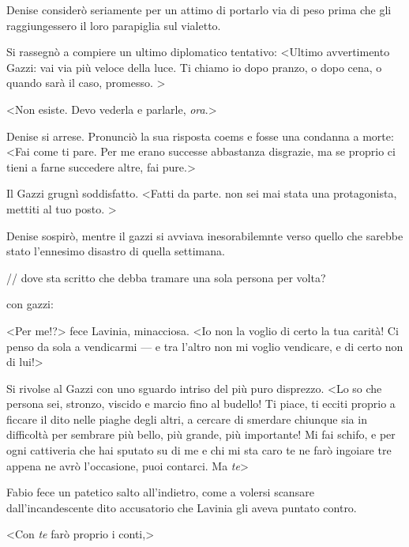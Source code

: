 Denise considerò seriamente per un attimo di portarlo via di peso prima
che gli raggiungessero il loro parapiglia sul vialetto.

Si rassegnò a compiere un ultimo diplomatico tentativo:
\textless{}Ultimo avvertimento Gazzi: vai via più veloce della luce. Ti
chiamo io dopo pranzo, o dopo cena, o quando sarà il caso, promesso.
\textgreater{}

\textless{}Non esiste. Devo vederla e parlarle,
\emph{ora}.\textgreater{}

Denise si arrese. Pronunciò la sua risposta coems e fosse una condanna a
morte: \textless{}Fai come ti pare. Per me erano successe abbastanza
disgrazie, ma se proprio ci tieni a farne succedere altre, fai
pure.\textgreater{}

Il Gazzi grugnì soddisfatto. \textless{}Fatti da parte. non sei mai
stata una protagonista, mettiti al tuo posto. \textgreater{}

Denise sospirò, mentre il gazzi si avviava inesorabilemnte verso quello
che sarebbe stato l'ennesimo disastro di quella settimana.

// dove sta scritto che debba tramare una sola persona per volta?

con gazzi:

\textless{}Per me!?\textgreater{} fece Lavinia, minacciosa.
\textless{}Io non la voglio di certo la tua carità! Ci penso da sola a
vendicarmi --- e tra l'altro non mi voglio vendicare, e di certo non di
lui!\textgreater{}

Si rivolse al Gazzi con uno sguardo intriso del più puro disprezzo.
\textless{}Lo so che persona sei, stronzo, viscido e marcio fino al
budello! Ti piace, ti ecciti proprio a ficcare il dito nelle piaghe
degli altri, a cercare di smerdare chiunque sia in difficoltà per
sembrare più bello, più grande, più importante! Mi fai schifo, e per
ogni cattiveria che hai sputato su di me e chi mi sta caro te ne farò
ingoiare tre appena ne avrò l'occasione, puoi contarci. Ma
\emph{te}\textgreater{}

Fabio fece un patetico salto all'indietro, come a volersi scansare
dall'incandescente dito accusatorio che Lavinia gli aveva puntato
contro.

\textless{}Con \emph{te} farò proprio i conti,\textgreater{}
